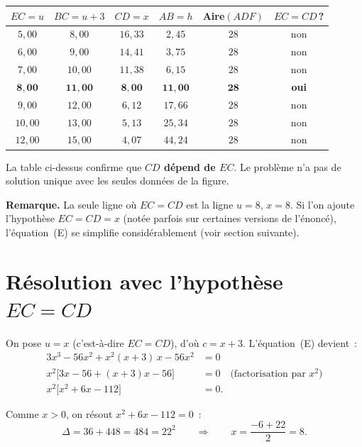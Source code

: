 ﻿\documentclass[a4paper,12pt]{article}
\begin{document}
\begin{center}
\begin{tabular}{@{}cccccc@{}}
\toprule
$EC = u$ & $BC = u{+}3$ & $CD = x$ & $AB = h$ & Aire$(ADF)$ & $EC = CD$\,? \\
\midrule
$5{,}00$ & $8{,}00$  & $16{,}33$  & $2{,}45$ & $28$ &  non \\
$6{,}00$ & $9{,}00$  & $14{,}41$  & $3{,}75$ & $28$ &  non \\
$7{,}00$ & $10{,}00$ & $11{,}38$  & $6{,}15$ & $28$ &  non \\
$\mathbf{8{,}00}$ & $\mathbf{11{,}00}$ & $\mathbf{8{,}00}$ & $\mathbf{11{,}00}$ & $\mathbf{28}$ & \textbf{oui} \\
$9{,}00$ & $12{,}00$ & $6{,}12$  & $17{,}66$ & $28$ &  non \\
$10{,}00$ & $13{,}00$ & $5{,}13$ & $25{,}34$ & $28$ &  non \\
$12{,}00$ & $15{,}00$ & $4{,}07$ & $44{,}24$ & $28$ &  non \\
\bottomrule
\end{tabular}
\end{center}

\medskip

La table ci-dessus confirme que \textbf{$CD$ d\'epend de $EC$}.
Le probl\`eme n'a pas de solution unique avec les seules donn\'ees
de la figure.

\medskip

\textbf{Remarque.}
La seule ligne o\`u $EC = CD$ est la ligne $u = 8$, $x = 8$.
Si l'on ajoute l'hypoth\`ese $EC = CD = x$ (not\'ee parfois sur certaines
versions de l'\'enonc\'e), l'\'equation~(E) se simplifie consid\'erablement
(voir section suivante).

\section{R\'esolution avec l'hypoth\`ese $EC = CD$}

On pose $u = x$ (c'est-\`a-dire $EC = CD$), d'o\`u $c = x + 3$.
L'\'equation~(E) devient~:
\begin{align*}
  3x^3 - 56x^2 + x^2(x+3)\,x - 56x^2 &= 0 \\
  x^2\bigl[3x - 56 + (x+3)x - 56\bigr] &= 0 \quad\text{(factorisation par $x^2$)}\\
  x^2\bigl[x^2 + 6x - 112\bigr] &= 0.
\end{align*}

Comme $x > 0$, on r\'esout $x^2 + 6x - 112 = 0$~:
\[
  \Delta = 36 + 448 = 484 = 22^2
  \qquad\Longrightarrow\qquad
  x = \frac{-6 + 22}{2} = 8.
\]
\end{document}
